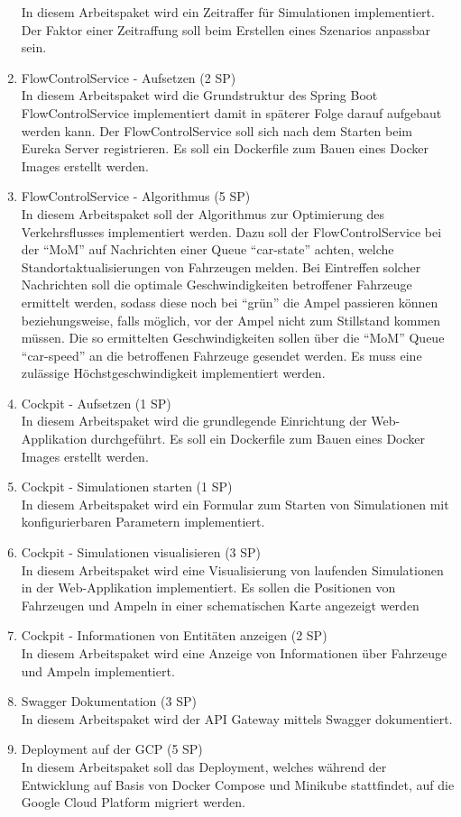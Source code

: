 \begin{enumerate}
  		In diesem Arbeitspaket wird ein Zeitraffer für Simulationen implementiert.
  		Der Faktor einer Zeitraffung soll beim Erstellen eines Szenarios anpassbar sein.
    \item FlowControlService - Aufsetzen (2 SP)\\
  		In diesem Arbeitspaket wird die Grundstruktur des Spring Boot FlowControlService implementiert damit in späterer Folge darauf aufgebaut werden kann.
  		Der FlowControlService soll sich nach dem Starten beim Eureka Server registrieren.
  		Es soll ein Dockerfile zum Bauen eines Docker Images erstellt werden.
  \item FlowControlService - Algorithmus (5 SP)\\
  		In diesem Arbeitspaket soll der Algorithmus zur Optimierung des Verkehrsflusses implementiert werden.
  		Dazu soll der FlowControlService bei der \enquote{MoM} auf Nachrichten einer Queue \enquote{car-state} achten, welche Standortaktualisierungen von Fahrzeugen melden.
  		Bei Eintreffen solcher Nachrichten soll die optimale Geschwindigkeiten betroffener Fahrzeuge ermittelt werden, sodass diese noch bei \enquote{grün} die Ampel passieren können beziehungsweise, falls möglich, vor der Ampel nicht zum Stillstand kommen müssen.
  		Die so ermittelten Geschwindigkeiten sollen über die \enquote{MoM} Queue \enquote{car-speed} an die betroffenen Fahrzeuge gesendet werden.
  		Es muss eine zulässige Höchstgeschwindigkeit implementiert werden.
  \item Cockpit - Aufsetzen (1 SP)\\
  		In diesem Arbeitspaket wird die grundlegende Einrichtung der Web-Applikation durchgeführt.
  		Es soll ein Dockerfile zum Bauen eines Docker Images erstellt werden.
  \item Cockpit - Simulationen starten (1 SP)\\
 		In diesem Arbeitspaket wird ein Formular zum Starten von Simulationen mit konfigurierbaren Parametern implementiert.
  \item Cockpit - Simulationen visualisieren (3 SP)\\
		In diesem Arbeitspaket wird eine Visualisierung von laufenden Simulationen in der Web-Applikation implementiert.
		Es sollen die Positionen von Fahrzeugen und Ampeln in einer schematischen Karte angezeigt werden
  \item Cockpit - Informationen von Entitäten anzeigen (2 SP)\\
  		In diesem Arbeitspaket wird eine Anzeige von Informationen über Fahrzeuge und Ampeln implementiert.
  \item Swagger Dokumentation (3 SP)\\
  		In diesem Arbeitspaket wird der API Gateway mittels Swagger dokumentiert.
  \item Deployment auf der GCP (5 SP)\\
  		In diesem Arbeitspaket soll das Deployment, welches während der Entwicklung auf Basis von Docker Compose und Minikube stattfindet, auf die Google Cloud Platform migriert werden.
\end{enumerate}
